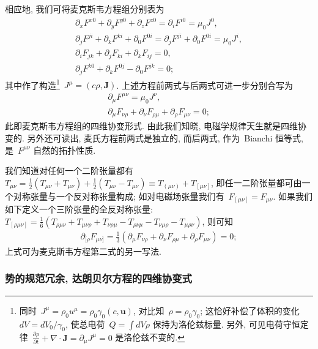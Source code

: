 相应地, 我们可将麦克斯韦方程组分别表为
\begin{gather}
\partial_xF^{x0}+\partial_yF^{y0}+\partial_zF^{z0}=\partial_iF^{i0}=\mu_0 J^0,\\
\partial_jF^{ji}+\partial_kF^{ki}+\partial_0F^{0i}=\partial_jF^{ji}+\partial_0F^{0i}=\mu_0J^i,\\
\partial_iF_{jk}+\partial_jF_{ki}+\partial_kF_{ij}=0,\\
\partial_jF^{k0}+\partial_kF^{0j}-\partial_0F^{jk}=0;
\end{gather}
其中作了构造\footnote{同时~$J^\mu=\rho_0 u^\mu=\rho_0\gamma_0(c,\bm{u})$, 对比知~$\rho=\rho_0\gamma_0$; 这恰好补偿了体积的变化~$dV=dV_0/\gamma_0$, 使总电荷~$Q=\int dV\rho$ 保持为洛伦兹标量. 另外, 可见电荷守恒定律~$\frac{\partial\rho}{\partial t}+\nabla\cdot\bm{J}=\partial_\mu J^\mu=0$ 是洛伦兹不变的.}~$J^\mu=(c\rho,\bm{J})$. 上述方程前两式与后两式可进一步分别合写为
\begin{gather}
\partial_\mu F^{\mu\nu}=\mu_0J^\nu,\\
\partial_\mu F_{\nu\rho}+\partial_\nu F_{\rho\mu}+\partial_\rho F_{\mu\nu}=0;
\end{gather}
此即麦克斯韦方程组的四维协变形式. 由此我们知晓, 电磁学规律天生就是四维协变的.%
另外还可读出, 麦氏方程前两式是独立的, 而后两式, 作为~Bianchi 恒等式, 是~$F^{\mu\nu}$ 自然的拓扑性质.

我们知道对任何一个二阶张量都有~$T_{\mu\nu}=\frac{1}{2}(T_{\mu\nu}+T_{\mu\nu})+\frac{1}{2}(T_{\mu\nu}-T_{\mu\nu})\equiv T_{(\mu\nu)}+T_{[\mu\nu]}$, 即任一二阶张量都可由一个对称张量与一个反对称张量构成; 如对电磁场张量我们有~$F_{[\mu\nu]}=F_{\mu\nu}$. 如果我们如下定义一个三阶张量的全反对称张量: $T_{[\rho\mu\nu]}=\frac{1}{6}(T_{\rho\mu\nu}+T_{\mu\nu\rho}+T_{\nu\rho\mu}-T_{\rho\nu\mu}-T_{\nu\mu\rho}-T_{\mu\rho\nu})$, 则可知
\begin{gather}
\partial_{[\rho}F_{\mu\nu]}=\frac{1}{3}(\partial_\mu F_{\nu\rho}+\partial_\nu F_{\rho\mu}+\partial_\rho F_{\mu\nu})=0;
\end{gather}
上式可为麦克斯韦方程第二式的另一写法.

\subsubsection{势的规范冗余, 达朗贝尔方程的四维协变式}

